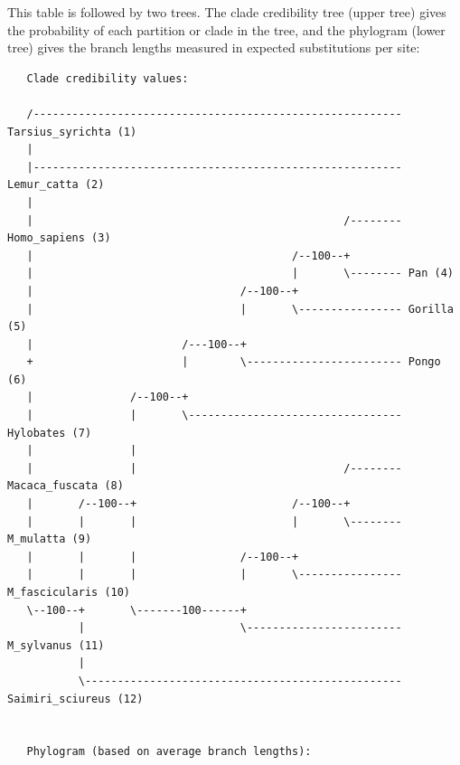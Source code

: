 \documentclass[12pt]{book}
\begin{document}
This table is followed by two trees. The clade credibility tree (upper tree) gives the probability of each 
partition or clade in the tree, and the phylogram (lower tree) gives the branch lengths measured in expected 
substitutions per site:

\begin{singlespacing}
\footnotesize
\begin{verbatim}
   Clade credibility values:
  
   /--------------------------------------------------------- Tarsius_syrichta (1)
   |                                                                               
   |--------------------------------------------------------- Lemur_catta (2)
   |                                                                               
   |                                                /-------- Homo_sapiens (3)
   |                                        /--100--+                              
   |                                        |       \-------- Pan (4)
   |                                /--100--+                                      
   |                                |       \---------------- Gorilla (5)
   |                       /---100--+                                              
   +                       |        \------------------------ Pongo (6)
   |               /--100--+                                                       
   |               |       \--------------------------------- Hylobates (7)
   |               |                                                               
   |               |                                /-------- Macaca_fuscata (8)
   |       /--100--+                        /--100--+                              
   |       |       |                        |       \-------- M_mulatta (9)
   |       |       |                /--100--+                                      
   |       |       |                |       \---------------- M_fascicularis (10)
   \--100--+       \-------100------+                                              
           |                        \------------------------ M_sylvanus (11)
           |                                                                       
           \------------------------------------------------- Saimiri_sciureus (12)
                                                                                   

   Phylogram (based on average branch lengths):
  

\end{verbatim}
\end{singlespacing}
\end{document}
